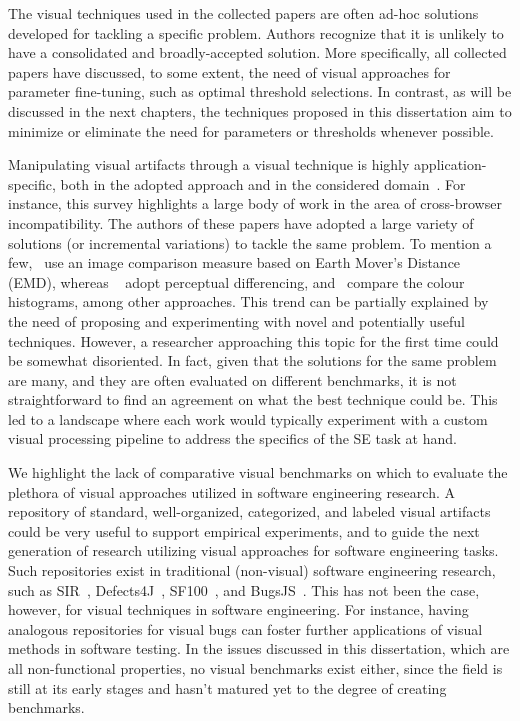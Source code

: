 The visual techniques used in the collected papers are often ad-hoc solutions developed for tackling a specific problem. 
Authors recognize that it is unlikely to have a consolidated and broadly-accepted solution.  
More specifically, all collected papers have discussed, to some extent, the need of visual approaches for parameter fine-tuning, such as optimal threshold selections. 
In contrast, as will be discussed in the next chapters, the 
techniques proposed in this dissertation aim to minimize or eliminate the need for parameters or thresholds whenever possible. 

Manipulating visual artifacts through a visual technique is highly application-specific, both in the adopted approach and in the considered domain~\cite{2020-Yandrapally-ICSE}. 
For instance, this survey highlights a large body of work in the area of
cross-browser incompatibility.
The authors of these papers have adopted a large variety of solutions
(or incremental variations) to tackle the same problem.
To mention a few,~\citet{Choudhary-2010-ICSM} use an image comparison measure
based on Earth Mover's Distance (EMD), whereas ~\citet{Mahajan-2015-ICST} adopt
perceptual differencing, and~\citet{He-2016-ICWS} compare the colour histograms,
among other approaches.
This trend can be partially explained by the need of proposing and experimenting
with novel and potentially useful techniques.
However, a researcher approaching this topic for the first time could be
somewhat disoriented.
In fact, given that the solutions for the same problem are many,
and they are often evaluated on different benchmarks,
it is not straightforward to find an agreement on what the best technique could be. 
This led to a landscape where each work would typically experiment with a custom
visual processing pipeline to address the specifics of the SE task at hand.

We highlight the lack of comparative visual benchmarks on which to evaluate
the plethora of visual approaches utilized in software engineering research. 
A repository of standard, well-organized, categorized, and labeled visual artifacts could
be very useful to support empirical experiments, and to guide
the next generation of research utilizing visual approaches
for software engineering tasks.
Such repositories exist in traditional
(non-visual) software engineering research,
such as SIR~\cite{Do:2005:SCE:1089922.1089928},
Defects4J~\cite{Just:2014:DDE:2610384.2628055}, SF100~\cite{sf100}, and BugsJS~\cite{bugsjs:icst19,2020-Gyimesi-STVR}. This has not been the case, however, for visual techniques in software engineering.
For instance, having analogous repositories for visual bugs can foster
further applications of visual methods in software testing. 
In the issues discussed in this dissertation, which are all non-functional properties, no visual benchmarks exist either, since 
the field is still at its early stages and hasn't matured yet to the degree of creating benchmarks. 

